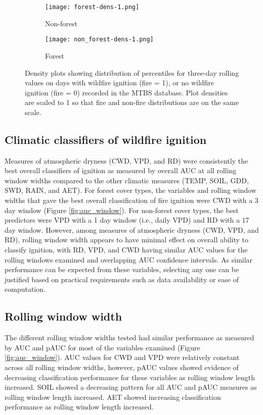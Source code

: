 \documentclass[11p]{article}
\begin{document}
\begin{figure}[htbp]
  \centering
  \begin{subfigure}{.5\textwidth}
    \centering
    \texttt{[image: forest-dens-1.png]}
    \caption{Non-forest}
    \label{fig:dens-nf}
  \end{subfigure}%
  \begin{subfigure}{.5\textwidth}
    \centering
    \texttt{[image: non\_forest-dens-1.png]}
    \caption{Forest}
    \label{fig:dens-f}
  \end{subfigure}
  \caption{Density plots showing distribution of percentiles for three-day rolling values on days with wildfire ignition (fire = 1), or no wildfire ignition (fire = 0) recorded in the MTBS database. Plot densities are scaled to 1 so that fire and non-fire distributions are on the same scale.}
  \label{fig:dens}
\end{figure}

\subsection{Climatic classifiers of wildfire ignition}

Measures of atmospheric dryness (CWD, VPD, and RD) were consistently the best overall classifiers of ignition as measured by overall AUC at all rolling window widths compared to the other climatic measures (TEMP, SOIL, GDD, SWD, RAIN, and AET). For forest cover types, the variables and rolling window widths that gave the best overall classification of fire ignition were CWD with a 3 day window (Figure \ref{fig:auc_window}). For non-forest cover types, the best predictors were VPD with a 1 day window (i.e., daily VPD) and RD with a 17 day window. However, among measures of atmospheric dryness (CWD, VPD, and RD), rolling window width appears to have minimal effect on overall ability to classify ignition, with RD, VPD, and CWD having similar AUC values for the rolling windows examined and overlapping AUC confidence intervals. As similar performance can be expected from these variables, selecting any one can be justified based on practical requirements such as data availability or ease of computation.

\subsection{Rolling window width}

The different rolling window widths tested had similar performance as measured by AUC and pAUC for most of the variables examined (Figure \ref{fig:auc_window}). AUC values for CWD and VPD were relatively constant across all rolling window widths, however, pAUC values showed evidence of decreasing classification performance for these variables as rolling window length increased. SOIL showed a decreasing pattern for all AUC and pAUC measures as rolling window length increased. AET showed increasing classification performance as rolling window length increased.  
\end{document}
